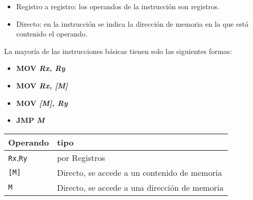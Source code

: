 \documentclass[12pt,twoside]{templates/unerthesis}
\begin{document}
\begin{itemize}
\item
  Registro a registro: los operandos de la instrucción son registros.
\item
  Directo: en la instrucción se indica la dirección de memoria en la que está contenido el operando.
\end{itemize}

La mayoría de las instrucciones básicas tienen solo las siguientes formas:

\begin{itemize}
\item
  \textbf{MOV \emph{Rx, Ry}}
\item
  \textbf{MOV \emph{Rx, {[}M{]}}}
\item
  \textbf{MOV \emph{{[}M{]}, Ry}}
\item
  \textbf{JMP \emph{M}}
\end{itemize}

\begin{longtable}[]{@{}ll@{}}
\toprule
Operando & tipo\tabularnewline
\midrule
\endhead
\texttt{Rx},\texttt{Ry} & por Registros\tabularnewline
\texttt{{[}M{]}} & Directo, se accede a un contenido de memoria\tabularnewline
\texttt{M} & Directo, se accede a una dirección de memoria\tabularnewline
\bottomrule
\end{longtable}
\end{document}
